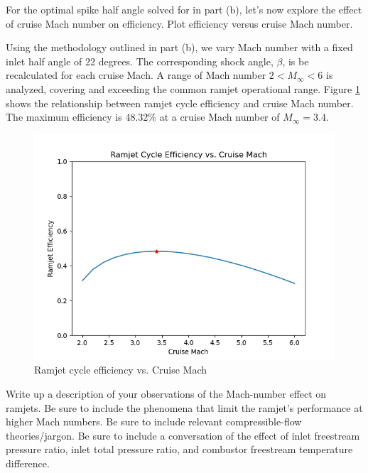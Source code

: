 \documentclass[../main.tex]{subfiles}
\begin{document}

For the optimal spike half angle solved for in part (b), let's now explore the effect of cruise Mach number on efficiency. 
Plot efficiency versus cruise Mach number.

\solution{}
Using the methodology outlined in part (b), we vary Mach number with a fixed inlet half angle of 22 degrees.
The corresponding shock angle, \(\beta\), is be recalculated for each cruise Mach.
A range of Mach number \(2<M_\infty<6\) is analyzed, covering and exceeding the common ramjet operational range.
Figure \ref{eta_vs_mach} shows the relationship between ramjet cycle efficiency and cruise Mach number.
The maximum efficiency is 48.32\% at a cruise Mach number of \(M_\infty=3.4\).

\begin{figure}[h!]
    \centering
    \includegraphics[]{../../images/problem_2/eta_vs_mach.png}
    \caption{Ramjet cycle efficiency vs. Cruise Mach}
    \label{eta_vs_mach}
\end{figure}


Write up a description of your observations of the Mach-number effect on ramjets. 
Be sure to include the phenomena that limit the ramjet's performance at higher Mach numbers.
Be sure to include relevant compressible-flow theories/jargon. 
Be sure to include a conversation of the effect of inlet freestream pressure ratio, inlet total pressure ratio, and combustor freestream temperature difference.
\end{document}
